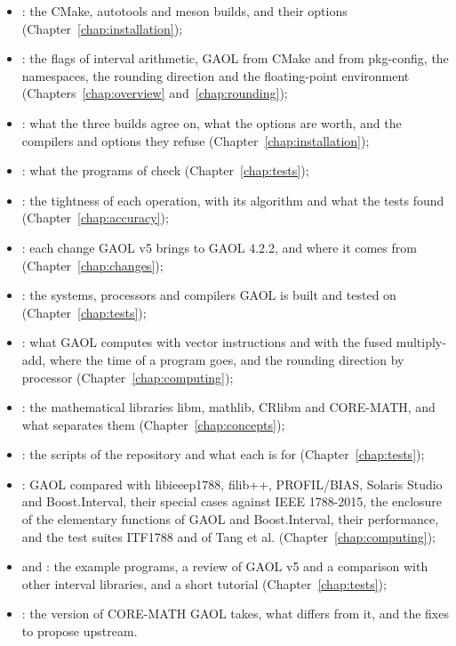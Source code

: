 \begin{itemize}
\item {}: the CMake, autotools and meson builds, and
  their options (Chapter~\ref{chap:installation});
\item {}: the flags of interval arithmetic, GAOL from CMake
  and from pkg-config, the namespaces, the rounding direction and the
  floating-point environment (Chapters~\ref{chap:overview}
  and~\ref{chap:rounding});
\item {}: what the three builds agree on, what the
  options are worth, and the compilers and options they refuse
  (Chapter~\ref{chap:installation});
\item {}: what the programs of  check
  (Chapter~\ref{chap:tests});
\item {}: the tightness of each operation, with its
  algorithm and what the tests found (Chapter~\ref{chap:accuracy});
\item {}: each change GAOL v5 brings to GAOL 4.2.2,
  and where it comes from (Chapter~\ref{chap:changes});
\item {}: the systems, processors and
  compilers GAOL is built and tested on (Chapter~\ref{chap:tests});
\item {}: what GAOL computes with vector instructions and
  with the fused multiply-add, where the time of a program goes, and the
  rounding direction by processor (Chapter~\ref{chap:computing});
\item {}: the mathematical libraries libm,
  mathlib, CRlibm and CORE-MATH, and what separates them
  (Chapter~\ref{chap:concepts});
\item {}: the scripts of the repository and what each is
  for (Chapter~\ref{chap:tests});
\item {}: GAOL compared with libieeep1788,
  filib++, PROFIL/BIAS, Solaris Studio and Boost.Interval, their special
  cases against IEEE 1788-2015, the enclosure of the elementary functions of
  GAOL and Boost.Interval, their performance, and the test suites ITF1788 and
  of Tang et al. (Chapter~\ref{chap:computing});
\item {} and : the
  example programs, a review of GAOL v5 and a comparison with other interval
  libraries, and a short tutorial (Chapter~\ref{chap:tests});
\item {}: the version of CORE-MATH GAOL takes, what differs
  from it, and the fixes to propose upstream.
\end{itemize}

